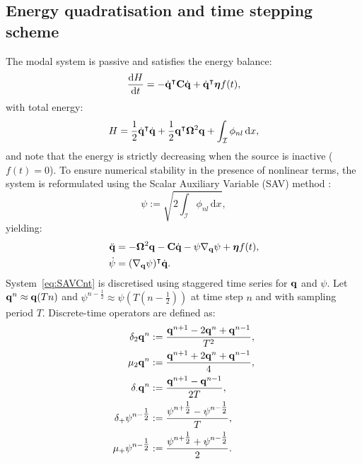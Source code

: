 \subsection{Energy quadratisation and time stepping scheme}
The modal system is passive and satisfies the energy balance:
\begin{equation}
\frac{\mathrm d H}{\mathrm dt} = -\dot {\bf q}^{\intercal}{\bf C}\dot{\bf q} + \dot{\bf q}^{\intercal}{\boldsymbol \eta} f(t),
\end{equation}
with total energy:
\begin{equation}
H = \frac{1}{2} \dot{\bf q}^{\intercal} \dot{\bf q} + \frac{1}{2} {\bf q}^{\intercal} {\bf \Omega}^2 {\bf q} + \int_{\mathcal I} \phi_{nl}\,\mathrm dx,
\end{equation}
and note that the energy is strictly decreasing when the source is inactive ($f(t) = 0$). To ensure numerical stability in the presence of nonlinear terms, the system is reformulated using the Scalar Auxiliary Variable (SAV) method \cite{bilbao2023explicit, vanWalstijn_JSV_2024}:
\begin{equation}
\psi := \sqrt{2 \int_{\mathcal I} \phi_{nl}\,\mathrm dx},
\end{equation}
yielding:
\begin{subequations}\label{eq:SAVCnt}
\begin{align}
   \ddot {\bf q} &= -{\bf \Omega}^2{\bf q} - {\bf C}\dot{\bf q} - \psi \nabla_{\bf q}\psi + {\boldsymbol \eta} f(t), \\
   \dot \psi &=  (\nabla_{\bf q}\psi)^\intercal \dot {\bf q}.
\end{align}
\end{subequations}
System~\eqref{eq:SAVCnt} is discretised using staggered time series for ${\bf q}$ and $\psi$. Let ${\bf q}^n \approx {\bf q}(Tn)$ and $\psi^{n-\tfrac{1}{2}} \approx \psi(T(n - \tfrac{1}{2}))$ at time step $n$ and with sampling period $T$. Discrete-time operators are defined as:
\begin{subequations}
\begin{align}
\delta_{2} {\bf q}^n &:= \frac{{\bf q}^{n+1} - 2{\bf q}^n + {\bf q}^{n-1}}{T^2}, \\
\mu_{2} {\bf q}^n &:= \frac{{\bf q}^{n+1} + 2{\bf q}^n + {\bf q}^{n-1}}{4}, \\
\delta_{\cdot} {\bf q}^n &:= \frac{{\bf q}^{n+1} - {\bf q}^{n-1}}{2T}, \\
\delta_{+} \psi^{n-\tfrac{1}{2}} &:= \frac{\psi^{n+\tfrac{1}{2}} - \psi^{n-\tfrac{1}{2}}}{T}, \\
\mu_{+} \psi^{n-\tfrac{1}{2}} &:= \frac{\psi^{n+\tfrac{1}{2}} + \psi^{n-\tfrac{1}{2}}}{2}.
\end{align}
\end{subequations}
